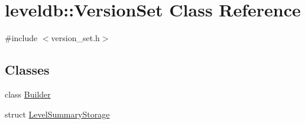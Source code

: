 \hypertarget{classleveldb_1_1_version_set}{}\section{leveldb\+:\+:Version\+Set Class Reference}
\label{classleveldb_1_1_version_set}


{\ttfamily \#include $<$version\+\_\+set.\+h$>$}

\subsection*{Classes}
\begin{DoxyCompactItemize}
\item 
class \hyperlink{classleveldb_1_1_version_set_1_1_builder}{Builder}
\item 
struct \hyperlink{structleveldb_1_1_version_set_1_1_level_summary_storage}{Level\+Summary\+Storage}
\end{DoxyCompactItemize}
